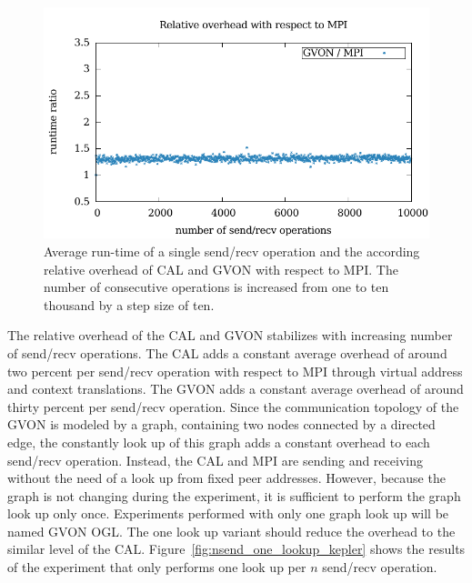 \begin{figure}[H]
\begin{minipage}[t]{0.5\textwidth}
    \includegraphics[width=\textwidth]{plots/50_nsend_overhead_gvon}
  \end{minipage}%
  \caption{Average run-time of a single send/recv operation and the
    according relative overhead of CAL and GVON with respect to
    MPI. The number of consecutive operations is increased from one to
    ten thousand by a step size of ten. }
  \label{fig:nsend_kepler}
\end{figure}

\noindent The relative overhead of the CAL and GVON stabilizes with
increasing number of send/recv operations.  The CAL adds a constant
average overhead of around two percent per send/recv operation with
respect to MPI through virtual address and context translations. The
GVON adds a constant average overhead of around thirty percent per
send/recv operation.  Since the communication topology of the GVON is
modeled by a graph, containing two nodes connected by a directed edge,
the constantly look up of this graph adds a constant overhead to each
send/recv operation.  Instead, the CAL and MPI are sending and
receiving without the need of a look up from fixed peer addresses.
However, because the graph is not changing during the experiment, it
is sufficient to perform the graph look up only once. Experiments
performed with only one graph look up will be named GVON OGL. The one
look up variant should reduce the overhead to the similar level of
the CAL. Figure~\ref{fig:nsend_one_lookup_kepler} shows the results of
the experiment that only performs one look up per $n$ send/recv
operation.

